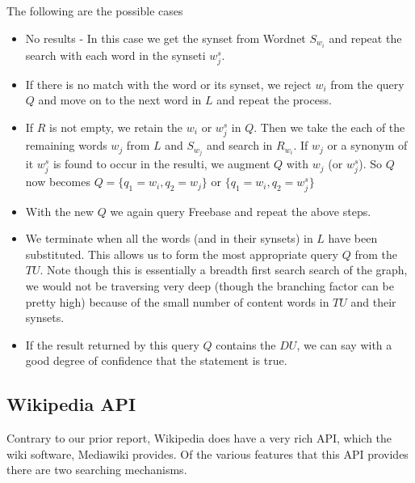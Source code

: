 \documentclass[12pt]{article}
\begin{document}
 The following are the possible cases
\begin{itemize}
\item No results - In this case we get the synset from Wordnet $S_{w_{i}}$ and repeat the search with each word in the synseti $w_{j}^{s}$.
\item If there is no match with the word or its synset, we reject $w_{i}$ from the query $Q$ and move on to the next word in $L$ and repeat the process.
\item If $R$ is not empty, we retain the $w_{i}$ or $w_{j}^{s}$ in $Q$. Then we take the each of the remaining words $w_{j}$ from $L$ and $S_{w_{j}}$ and search in $R_{w_{i}}$. If $w_{j}$ or a synonym of it $w_{j}^{s}$ is found to occur in the resulti, we augment $Q$ with $w_{j}$ (or $w_{j}^{s}$). So $Q$ now becomes $Q =\{q_{1}=w_{i}, q_{2}=w_{j}\}$ or $\{q_{1}=w_{i},q_{2}=w_{j}^{s}\}$ 
\item With the new $Q$ we again query Freebase and repeat the above steps.
\item We terminate when all the words (and in their synsets) in $L$ have been substituted. This allows us to form the most appropriate query $Q$ from the $TU$. Note though this is essentially a breadth first search search of the graph, we would not be traversing very deep (though the branching factor can be pretty high) because of the small number of content words in $TU$ and their synsets.
\item If the result returned by this query $Q$ contains the $DU$, we can say with a good degree of confidence that the statement is true.    
\end{itemize}
%
%


\subsection{Wikipedia API}

\label{March9to29}
Contrary to our prior report, Wikipedia does have a very rich API, which the wiki software, Mediawiki provides. Of the various features that this API provides there are two searching mechanisms. 
\end{document}
